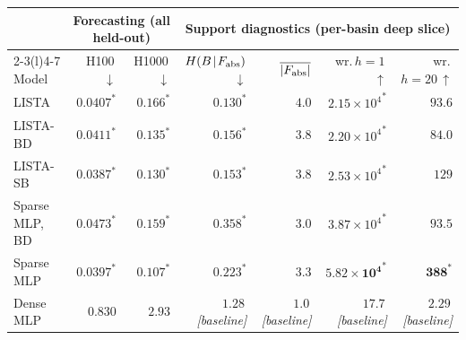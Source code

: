 \begin{tabular}{@{}l rr rrr r@{}}
\toprule
& \multicolumn{2}{c}{Forecasting (all held-out)} & \multicolumn{4}{c}{Support diagnostics (per-basin deep slice)} \\
\cmidrule(lr){2-3}\cmidrule(l){4-7}
Model & H100\,$\downarrow$ & H1000\,$\downarrow$ & $H(B\!\mid\!F_{\rm abs})$\,$\downarrow$ & $\overline{|F_{\rm abs}|}$ & wr.\,$h{=}1$\,$\uparrow$ & wr.\,$h{=}20$\,$\uparrow$ \\
\midrule
LISTA & ${0.0407}^{\ast}$ & ${0.166}^{\ast}$ & ${\mathbf{0.130}}^{\ast}$ & $\mathbf{4.0}$ & ${2.15{\times}10^{4}}^{\ast}$ & $93.6$ \\
LISTA-BD & ${0.0411}^{\ast}$ & ${0.135}^{\ast}$ & ${0.156}^{\ast}$ & $3.8$ & ${2.20{\times}10^{4}}^{\ast}$ & $84.0$ \\
LISTA-SB & ${\mathbf{0.0387}}^{\ast}$ & ${0.130}^{\ast}$ & ${0.153}^{\ast}$ & $3.8$ & ${2.53{\times}10^{4}}^{\ast}$ & $129$ \\
Sparse MLP, BD & ${0.0473}^{\ast}$ & ${0.159}^{\ast}$ & ${0.358}^{\ast}$ & $3.0$ & ${3.87{\times}10^{4}}^{\ast}$ & $93.5$ \\
Sparse MLP & ${0.0397}^{\ast}$ & ${\mathbf{0.107}}^{\ast}$ & ${0.223}^{\ast}$ & $3.3$ & ${\mathbf{5.82{\times}10^{4}}}^{\ast}$ & ${\mathbf{388}}^{\ast}$ \\
Dense MLP & $0.830$ & $2.93$ & $1.28$\,\emph{[baseline]} & $1.0$\,\emph{[baseline]} & $17.7$\,\emph{[baseline]} & $2.29$\,\emph{[baseline]} \\
\bottomrule
\end{tabular}
